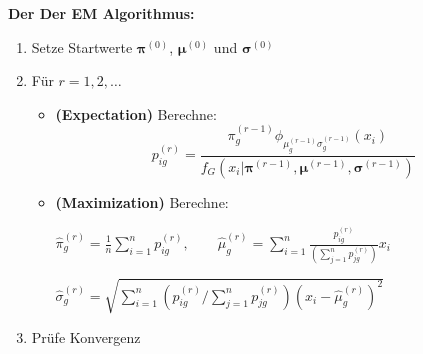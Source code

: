 \documentclass[
]{book}
\begin{document}
\textbf{Der Der EM Algorithmus:}

\begin{enumerate}
\def\labelenumi{\arabic{enumi}.}
\item
  Setze Startwerte \(\boldsymbol{\pi}^{(0)}\), \(\boldsymbol{\mu}^{(0)}\) und \(\boldsymbol{\sigma}^{(0)}\)
\item
  Für \(r=1,2,\dots\)

  \begin{itemize}
  \item
    {\textbf{(Expectation)}} Berechne:
    \[p_{ig}^{(r)}=\frac{\pi_g^{(r-1)}\phi_{\mu^{(r-1)}_g\sigma_g^{(r-1)}}(x_i)}{f_G(x_i|\boldsymbol{\pi}^{(r-1)},\boldsymbol{\mu}^{(r-1)},\boldsymbol{\sigma}^{(r-1)})}\]
  \item
    {\textbf{(Maximization)}} Berechne:

    \(\hat\pi_g^{(r)}=\frac{1}{n}\sum_{i=1}^np_{ig}^{(r)},\quad\quad\hat\mu_g^{(r)}=\sum_{i=1}^n\frac{p_{ig}^{(r)}}{\left(\sum_{j=1}^np_{jg}^{(r)}\right)}x_i\)

    \(\hat\sigma_g^{(r)}=\sqrt{\sum_{i=1}^n\left(p_{ig}^{(r)}\Big/\sum_{j=1}^np_{jg}^{(r)}\right)\left(x_i-\hat\mu_g^{(r)}\right)^2}\)
  \end{itemize}
\item
  Prüfe Konvergenz
\end{enumerate}
\end{document}
